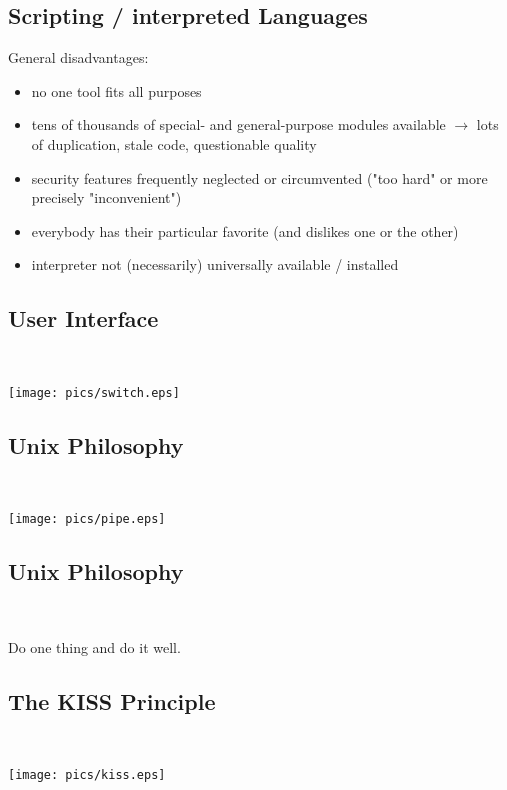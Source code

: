 \documentclass[xga]{xdvislides}
\begin{document}
\subsection{Scripting / interpreted Languages}
General disadvantages:
\begin{itemize}
	\item no one tool fits all purposes
	\item tens of thousands of special- and general-purpose modules
		available $\rightarrow$ lots of duplication, stale code,
		questionable quality
	\item security features frequently neglected or circumvented ("too
		hard" or more precisely "inconvenient")
	\item everybody has their particular favorite (and dislikes one or
		the other)
	\item interpreter not (necessarily) universally available /
		installed
\end{itemize}

\subsection{User Interface}
\\
\vspace*{\fill}
\begin{center}
	\texttt{[image: pics/switch.eps]}
\end{center}
\vspace*{\fill}

\subsection{Unix Philosophy}
\\
\vspace*{\fill}
\begin{center}
	\texttt{[image: pics/pipe.eps]}
\end{center}
\vspace*{\fill}

\subsection{Unix Philosophy}
\\
\Huge
\begin{center}
	Do one thing and do it well.
\end{center}
\Normalsize

\subsection{The KISS Principle}
\\
\vspace*{\fill}
\begin{center}
	\texttt{[image: pics/kiss.eps]}
\end{center}
\vspace*{\fill}
\end{document}
